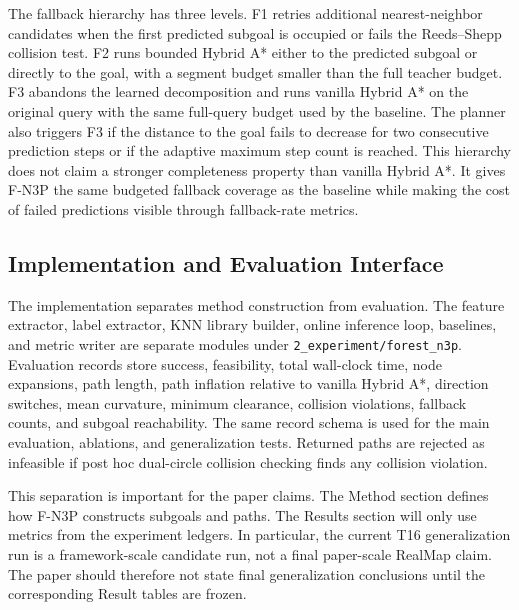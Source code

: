 \documentclass[11pt,a4paper]{article}
\begin{document}
The fallback hierarchy has three levels. F1 retries additional nearest-neighbor candidates when the first predicted subgoal is occupied or fails the Reeds--Shepp collision test. F2 runs bounded Hybrid A* either to the predicted subgoal or directly to the goal, with a segment budget smaller than the full teacher budget. F3 abandons the learned decomposition and runs vanilla Hybrid A* on the original query with the same full-query budget used by the baseline. The planner also triggers F3 if the distance to the goal fails to decrease for two consecutive prediction steps or if the adaptive maximum step count is reached. This hierarchy does not claim a stronger completeness property than vanilla Hybrid A*. It gives F-N3P the same budgeted fallback coverage as the baseline while making the cost of failed predictions visible through fallback-rate metrics.

\subsection{Implementation and Evaluation Interface}
\label{sec:method_implementation}

The implementation separates method construction from evaluation. The feature extractor, label extractor, KNN library builder, online inference loop, baselines, and metric writer are separate modules under \texttt{2\_experiment/forest\_n3p}. Evaluation records store success, feasibility, total wall-clock time, node expansions, path length, path inflation relative to vanilla Hybrid A*, direction switches, mean curvature, minimum clearance, collision violations, fallback counts, and subgoal reachability. The same record schema is used for the main evaluation, ablations, and generalization tests. Returned paths are rejected as infeasible if post hoc dual-circle collision checking finds any collision violation.

This separation is important for the paper claims. The Method section defines how F-N3P constructs subgoals and paths. The Results section will only use metrics from the experiment ledgers. In particular, the current T16 generalization run is a framework-scale candidate run, not a final paper-scale RealMap claim. The paper should therefore not state final generalization conclusions until the corresponding Result tables are frozen.


\end{document}

